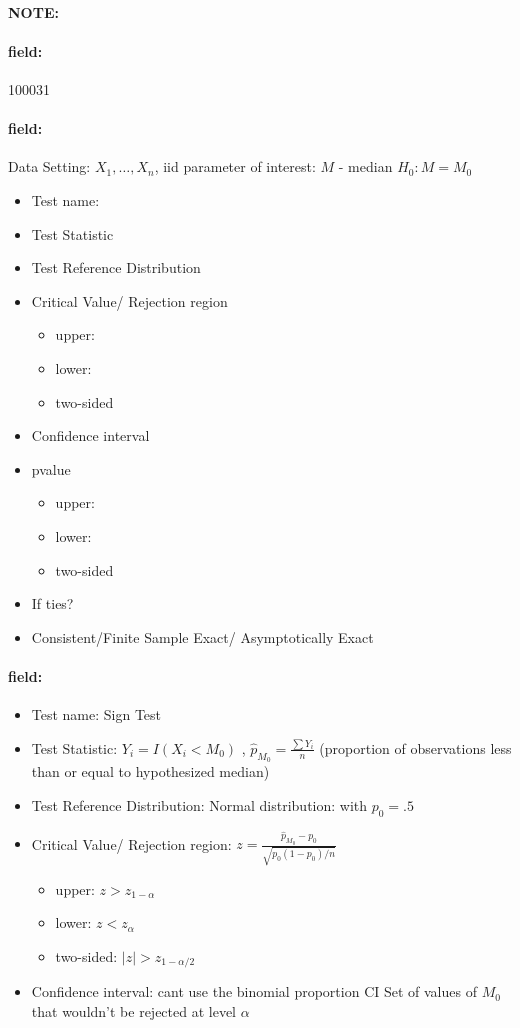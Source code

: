 \documentclass[12pt]{article}
\newenvironment{note}{\paragraph{NOTE:}}{}
\newenvironment{field}{\paragraph{field:}}{}
\begin{document}
\begin{note} \begin{field} \tiny 100031 \end{field}
 \begin{field}
  Data Setting: $X_1, \ldots, X_n$, iid parameter of interest: $M$ - median $H_0: M = M_0$
  \begin{itemize}
   \item Test name:
   \item Test Statistic
   \item Test Reference Distribution
   \item Critical Value/ Rejection region
         \begin{itemize}
          \item upper:
          \item lower:
          \item two-sided
         \end{itemize}
   \item Confidence interval
   \item pvalue
         \begin{itemize}
          \item upper:
          \item lower:
          \item two-sided
         \end{itemize}
   \item If ties?
   \item Consistent/Finite Sample Exact/ Asymptotically Exact
  \end{itemize}
 \end{field}
 \begin{field}
  \begin{itemize}
   \item Test name: Sign Test
   \item Test Statistic: $Y_i = I(X_i < M_0)$ , $\hat{p}_{M_0} = \frac{\sum Y_i}{n}$ (proportion of observations less than or equal to hypothesized median)
   \item Test Reference Distribution: Normal distribution: with $p_0 = .5$
   \item Critical Value/ Rejection region: $z = \frac{\hat{p}_{M_0} - p_0}{\sqrt{p_0(1-p_0)/n}}$
         \begin{itemize}
          \item upper: $z > z_{1-\alpha}$
          \item lower: $z < z_\alpha$
          \item two-sided: $|z| > z_{1-\alpha/2}$
         \end{itemize}
   \item Confidence interval: cant use the binomial proportion CI
         Set of values of $M_0$ that wouldn't be rejected at level $\alpha$


\end{itemize}
\end{field}
\end{note}
\end{document}
